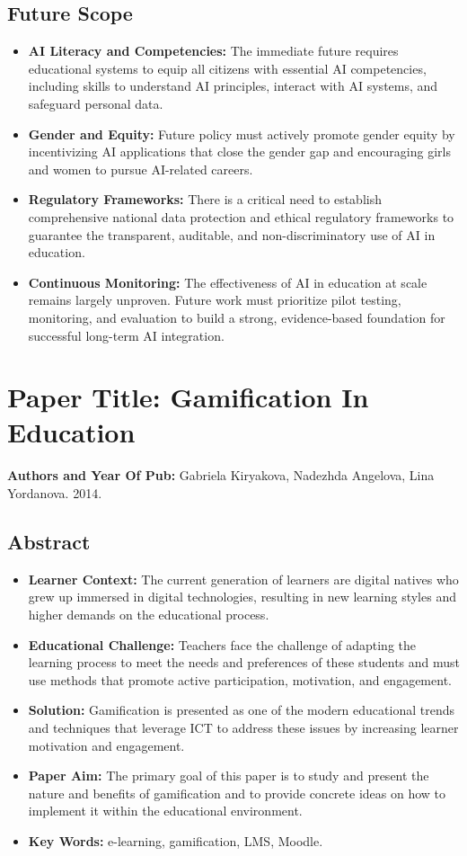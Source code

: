 \documentclass[12pt,a4paper]{report}
\begin{document}
\subsection{Future Scope}
\begin{itemize}
  \item \textbf{AI Literacy and Competencies:} The immediate future requires educational systems to equip all citizens with essential AI competencies, including skills to understand AI principles, interact with AI systems, and safeguard personal data.
  \item \textbf{Gender and Equity:} Future policy must actively promote gender equity by incentivizing AI applications that close the gender gap and encouraging girls and women to pursue AI-related careers.
  \item \textbf{Regulatory Frameworks:} There is a critical need to establish comprehensive national data protection and ethical regulatory frameworks to guarantee the transparent, auditable, and non-discriminatory use of AI in education.
  \item \textbf{Continuous Monitoring:} The effectiveness of AI in education at scale remains largely unproven. Future work must prioritize pilot testing, monitoring, and evaluation to build a strong, evidence-based foundation for successful long-term AI integration.
\end{itemize}

\section{Paper Title: Gamification In Education}
\textbf{Authors and Year Of Pub:} Gabriela Kiryakova, Nadezhda Angelova, Lina Yordanova. 2014.

\subsection{Abstract}
\begin{itemize}
  \item \textbf{Learner Context:} The current generation of learners are digital natives who grew up immersed in digital technologies, resulting in new learning styles and higher demands on the educational process.
  \item \textbf{Educational Challenge:} Teachers face the challenge of adapting the learning process to meet the needs and preferences of these students and must use methods that promote active participation, motivation, and engagement.
  \item \textbf{Solution:} Gamification is presented as one of the modern educational trends and techniques that leverage ICT to address these issues by increasing learner motivation and engagement.
  \item \textbf{Paper Aim:} The primary goal of this paper is to study and present the nature and benefits of gamification and to provide concrete ideas on how to implement it within the educational environment.
  \item \textbf{Key Words:} e-learning, gamification, LMS, Moodle.
\end{itemize}
\end{document}
